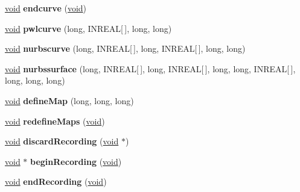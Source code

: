 \begin{DoxyCompactItemize}
\hyperlink{interfacevoid}{void} {\bfseries endcurve} (\hyperlink{interfacevoid}{void})
\item 
\mbox{\label{class_nurbs_tessellator_adcab8c96b85174b4fcb1b5b2cce7b614}} 
\hyperlink{interfacevoid}{void} {\bfseries pwlcurve} (long, I\+N\+R\+E\+AL\mbox{[}$\,$\mbox{]}, long, long)
\item 
\mbox{\label{class_nurbs_tessellator_abedc88cbcd9ac8d562ec3049420ee060}} 
\hyperlink{interfacevoid}{void} {\bfseries nurbscurve} (long, I\+N\+R\+E\+AL\mbox{[}$\,$\mbox{]}, long, I\+N\+R\+E\+AL\mbox{[}$\,$\mbox{]}, long, long)
\item 
\mbox{\label{class_nurbs_tessellator_ae1619f6b01e3eb88c4b1bca5a82ed4ae}} 
\hyperlink{interfacevoid}{void} {\bfseries nurbssurface} (long, I\+N\+R\+E\+AL\mbox{[}$\,$\mbox{]}, long, I\+N\+R\+E\+AL\mbox{[}$\,$\mbox{]}, long, long, I\+N\+R\+E\+AL\mbox{[}$\,$\mbox{]}, long, long, long)
\item 
\mbox{\label{class_nurbs_tessellator_ad792d79b2e1a0a0fb9358228bb0fc799}} 
\hyperlink{interfacevoid}{void} {\bfseries define\+Map} (long, long, long)
\item 
\mbox{\label{class_nurbs_tessellator_abca7876262601d4e01bab048bd10d629}} 
\hyperlink{interfacevoid}{void} {\bfseries redefine\+Maps} (\hyperlink{interfacevoid}{void})
\item 
\mbox{\label{class_nurbs_tessellator_a5b27c04c57be7c382b5454d4af65c802}} 
\hyperlink{interfacevoid}{void} {\bfseries discard\+Recording} (\hyperlink{interfacevoid}{void} $\ast$)
\item 
\mbox{\label{class_nurbs_tessellator_a5d517cfcf66859649f7025e6c6c326d5}} 
\hyperlink{interfacevoid}{void} $\ast$ {\bfseries begin\+Recording} (\hyperlink{interfacevoid}{void})
\item 
\mbox{\label{class_nurbs_tessellator_aa169084a21663fdac441148d85304b9c}} 
\hyperlink{interfacevoid}{void} {\bfseries end\+Recording} (\hyperlink{interfacevoid}{void})
\item 

\end{DoxyCompactItemize}
